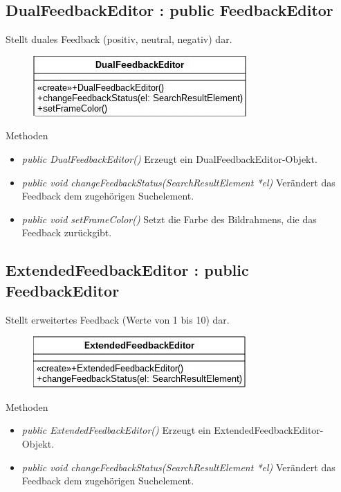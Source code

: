 \subsection*{DualFeedbackEditor : public FeedbackEditor}
Stellt duales Feedback (positiv, neutral, negativ) dar.

\begin{figure}[H]
	\centering
	\includegraphics[scale=0.5]{img/Klassendiagramm/Klassen/View/DualFeedbackEditor}
	\label{fig:dualFeedbackEditor}
\end{figure}

Methoden
\begin{itemize}
	\item\textit{public DualFeedbackEditor()}
	Erzeugt ein DualFeedbackEditor-Objekt.
	\item\textit{public void changeFeedbackStatus(SearchResultElement *el)}
	Verändert das Feedback dem zugehörigen Suchelement.
	\item\textit{public void setFrameColor()}
	Setzt die Farbe des Bildrahmens, die das Feedback zurückgibt. 
\end{itemize}

\subsection*{ExtendedFeedbackEditor : public FeedbackEditor}
Stellt erweitertes Feedback (Werte von 1 bis 10) dar.

\begin{figure}[H]
	\centering
	\includegraphics[scale=0.5]{img/Klassendiagramm/Klassen/View/ExtendedFeedbackEditor}
	\label{fig:ExtendedFeedbackEditor}
\end{figure}

Methoden
\begin{itemize}
	\item\textit{public ExtendedFeedbackEditor()}
	Erzeugt ein ExtendedFeedbackEditor-Objekt.
	\item\textit{public void changeFeedbackStatus(SearchResultElement *el)}
	Verändert das Feedback dem zugehörigen Suchelement.
\end{itemize}


